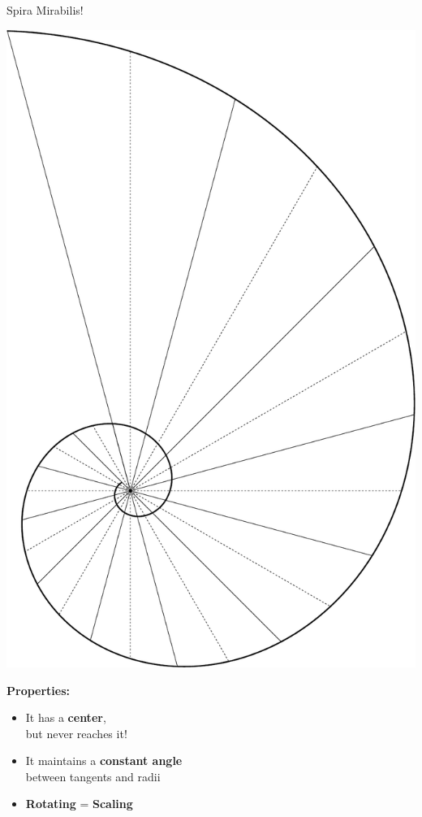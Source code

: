 \documentclass[14pt]{beamer}
\begin{document}
    \begin{frame}{Spira Mirabilis!}
        \begin{center}
            \begin{minipage}{20ex}
                \includegraphics[height=32ex]{pictures/Spiral_Phi_90.pdf}
            \end{minipage} \begin{minipage}{29ex}
                \textbf{\large \quad Properties:}
                \bigskip
                \begin{itemize}
                    \small
                    \item It has a \textbf{center},\\ but never reaches it!\\[2ex]
                    \item It maintains a \textbf{constant angle}\\ between tangents and radii\\[2ex]
                    \item \textbf{Rotating} = \textbf{Scaling}
                \end{itemize}
                \bigskip
            \end{minipage}            
        \end{center}
    \end{frame}


    {
    \begin{frame}[plain]
    \end{frame}
    }
\end{document}
